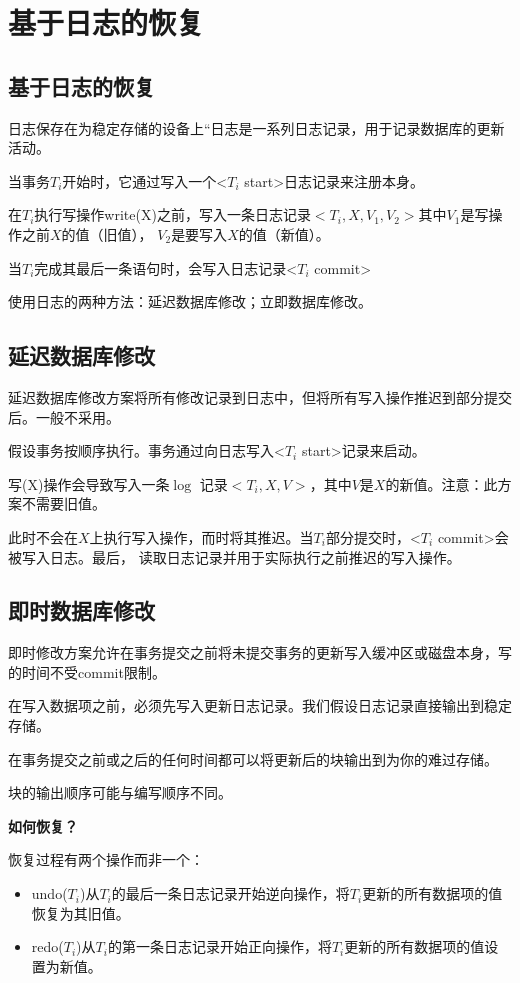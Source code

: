 \section{基于日志的恢复}

\subsection{基于日志的恢复}

日志保存在为稳定存储的设备上“日志是一系列日志记录，用于记录数据库的更新活动。

当事务$T_i$开始时，它通过写入一个<$T_i$ start>日志记录来注册本身。

在$T_i$执行写操作write(X)之前，写入一条日志记录$<T_i,X,V_1,V_2>$其中$V_1$是写操作之前$X$的值（旧值），
$V_2$是要写入$X$的值（新值）。

当$T_i$完成其最后一条语句时，会写入日志记录<$T_i$ commit>

使用日志的两种方法：延迟数据库修改；立即数据库修改。

\subsection{延迟数据库修改}

延迟数据库修改方案将所有修改记录到日志中，但将所有写入操作推迟到部分提交后。一般不采用。

假设事务按顺序执行。事务通过向日志写入<$T_i$ start>记录来启动。

写(X)操作会导致写入一条$\log$ 记录$<T_i,X,V>$，其中$V$是$X$的新值。注意：此方案不需要旧值。

此时不会在$X$上执行写入操作，而时将其推迟。当$T_i$部分提交时，<$T_i$ commit>会被写入日志。最后，
读取日志记录并用于实际执行之前推迟的写入操作。

\subsection{即时数据库修改}

即时修改方案允许在事务提交之前将未提交事务的更新写入缓冲区或磁盘本身，写的时间不受commit限制。

在写入数据项之前，必须先写入更新日志记录。我们假设日志记录直接输出到稳定存储。

在事务提交之前或之后的任何时间都可以将更新后的块输出到为你的难过存储。

块的输出顺序可能与编写顺序不同。

\noindent\textbf{如何恢复？}

恢复过程有两个操作而非一个：
\begin{itemize}
    \item undo($T_i$)从$T_i$的最后一条日志记录开始逆向操作，将$T_i$更新的所有数据项的值恢复为其旧值。
    \item redo($T_i$)从$T_i$的第一条日志记录开始正向操作，将$T_i$更新的所有数据项的值设置为新值。
\end{itemize}

